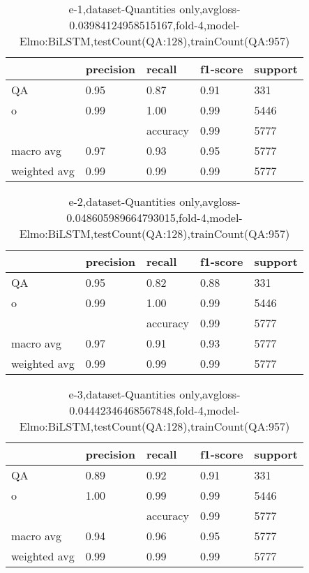 \begin{table}[!ht] 
\centering
\caption{e-1,dataset-Quantities only,avgloss-0.03984124958515167,fold-4,model-Elmo:BiLSTM,testCount(QA:128),trainCount(QA:957)}\label{e-1data-quantS.tsv}
\begin{tabularx}{300pt}{|X|X|X|X|X|}
\hline
&precision&recall&f1-score&support\\
\hline
QA&0.95&0.87&0.91&331\\
\hline
o&0.99&1.00&0.99&5446\\
\hline
&&accuracy&0.99&5777\\
\hline
macro avg&0.97&0.93&0.95&5777\\
\hline
weighted avg&0.99&0.99&0.99&5777\\
\hline
\end{tabularx}
\end{table}
\begin{table}[!ht] 
\centering
\caption{e-2,dataset-Quantities only,avgloss-0.048605989664793015,fold-4,model-Elmo:BiLSTM,testCount(QA:128),trainCount(QA:957)}\label{e-2data-quantS.tsv}
\begin{tabularx}{300pt}{|X|X|X|X|X|}
\hline
&precision&recall&f1-score&support\\
\hline
QA&0.95&0.82&0.88&331\\
\hline
o&0.99&1.00&0.99&5446\\
\hline
&&accuracy&0.99&5777\\
\hline
macro avg&0.97&0.91&0.93&5777\\
\hline
weighted avg&0.99&0.99&0.99&5777\\
\hline
\end{tabularx}
\end{table}
\begin{table}[!ht] 
\centering
\caption{e-3,dataset-Quantities only,avgloss-0.04442346468567848,fold-4,model-Elmo:BiLSTM,testCount(QA:128),trainCount(QA:957)}\label{e-3data-quantS.tsv}
\begin{tabularx}{300pt}{|X|X|X|X|X|}
\hline
&precision&recall&f1-score&support\\
\hline
QA&0.89&0.92&0.91&331\\
\hline
o&1.00&0.99&0.99&5446\\
\hline
&&accuracy&0.99&5777\\
\hline
macro avg&0.94&0.96&0.95&5777\\
\hline
weighted avg&0.99&0.99&0.99&5777\\
\hline
\end{tabularx}
\end{table}

